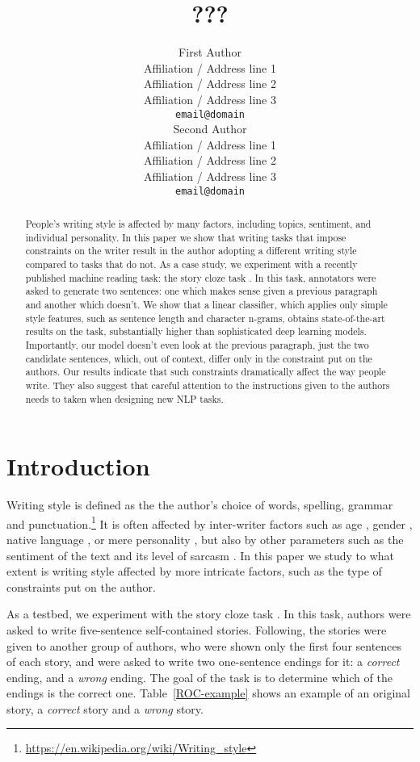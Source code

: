 \documentclass[11pt,a4paper]{article}
\title{???}
\author{First Author \\
  Affiliation / Address line 1 \\
  Affiliation / Address line 2 \\
  Affiliation / Address line 3 \\
  {\tt email@domain} \\\And
  Second Author \\
  Affiliation / Address line 1 \\
  Affiliation / Address line 2 \\
  Affiliation / Address line 3 \\
  {\tt email@domain} \\}
\date{}
\newcommand{\tabref}[1]{Table~\ref{#1}}
\begin{document}
\maketitle
\begin{abstract}
People's writing style is affected by many factors, including topics, sentiment, and individual personality. 
In this paper we show that writing tasks that impose constraints on the writer result in the author adopting a  different writing style compared to tasks that do not.
As a case study, we experiment with a recently published machine reading task: the story cloze task \cite{Mostafazadeh:2016}. 
In this task, annotators were asked to generate two sentences: one which makes sense given a previous paragraph and another which doesn't.
We show that a linear classifier, which applies only simple style features, such as sentence length and character n-grams, obtains state-of-the-art results on the task,
substantially higher than sophisticated deep learning models.
Importantly, our model doesn't even look at the previous paragraph, just the two candidate sentences, which, out of context, differ only in the constraint put on the authors. 
Our results indicate that such constraints dramatically affect the way people write. 
They also suggest that careful attention to the instructions given to the authors needs to taken when designing new NLP tasks.

\end{abstract}

\section{Introduction}
Writing style is defined as the the author's choice of words, spelling, grammar and punctuation.\footnote{\url{https://en.wikipedia.org/wiki/Writing_style}}
It is often affected by inter-writer factors such as age \cite{Schler:2006}, gender \cite{Argamon:2003}, native language \cite{Koppel:2005}, or mere personality \cite{Stamatatos:2009}, but also by other parameters such as the sentiment of the text \cite{Davidov:2010} and its level of sarcasm \cite{Tsur:2010}.  
In this paper we study to what extent is writing style affected by more intricate factors, such as the type of constraints put on the author. 

As a testbed, we experiment with the story cloze task \cite{Mostafazadeh:2016}. 
In this task, authors were asked to write five-sentence self-contained stories.
Following, the stories were given to another group of authors, who were shown only the first four sentences of each story, 
and were asked to write two one-sentence endings for it: a {\it correct} ending, and a {\it wrong} ending.
The goal of the task is to determine which of the endings is the correct one.
\tabref{ROC-example} shows an example of an original story, a {\it correct} story and a {\it wrong} story.
\end{document}
